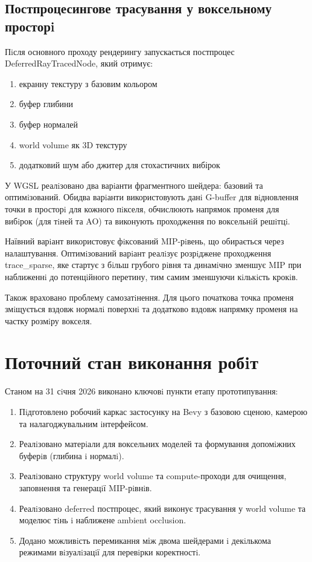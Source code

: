\documentclass[a4paper,12pt]{article}
\begin{document}
\subsection*{Постпроцесингове трасування у воксельному просторi}
Пiсля основного проходу рендерингу запускається постпроцес DeferredRayTracedNode, який отримує:
\begin{enumerate}
\item екранну текстуру з базовим кольором
\item буфер глибини
\item буфер нормалей
\item world volume як 3D текстуру
\item додатковий шум або джитер для стохастичних вибірок
\end{enumerate}

У WGSL реалiзовано два варiанти фрагментного шейдера: базовий та оптимiзований. Обидва варiанти використовують данi G-buffer для вiдновлення точки в просторi для кожного пiкселя, обчислюють напрямок променя для вибiрок (для тiней та AO) та виконують проходження по воксельнiй решiтцi.

Наївний варiант використовує фiксований MIP-рiвень, що обирається через налаштування. Оптимiзований варiант реалiзує розрiджене проходження trace\_sparse, яке стартує з бiльш грубого рiвня та динамiчно зменшує MIP при наближеннi до потенцiйного перетину, тим самим зменшуючи кiлькiсть крокiв.

Також враховано проблему самозатiнення. Для цього початкова точка променя змiщується вздовж нормалi поверхнi та додатково вздовж напрямку променя на частку розмiру вокселя.

\section*{Поточний стан виконання робiт}
Станом на 31 сiчня 2026 виконано ключовi пункти етапу прототипування:
\begin{enumerate}
\item Пiдготовлено робочий каркас застосунку на Bevy з базовою сценою, камерою та налагоджувальним iнтерфейсом.
\item Реалiзовано матерiали для воксельних моделей та формування допомiжних буферiв (глибина i нормалi).
\item Реалiзовано структуру world volume та compute-проходи для очищення, заповнення та генерацiї MIP-рiвнiв.
\item Реалiзовано deferred постпроцес, який виконує трасування у world volume та моделює тiнь i наближене ambient occlusion.
\item Додано можливiсть перемикання між двома шейдерами i декiлькома режимами вiзуалiзацiї для перевiрки коректностi.
\end{enumerate}
\end{document}
